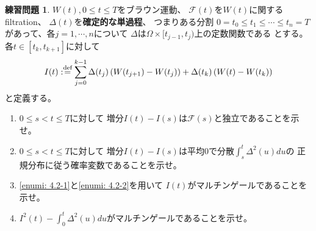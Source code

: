 \documentclass[uplatex]{jsarticle}
\theoremstyle{definition}
\newtheorem{prob}[prob]{練習問題}
\def\mcF{\mathcal{F}}
\def\dfn{:\overset{\mbox{{\scriptsize def}}}{=}}
\begin{document}
\begin{prob}\label{prob: 4.2}
  \(W(t), 0\leq t \leq T\)をブラウン運動、
  \(\mcF(t)\)を\(W(t)\)に関するfiltration、
  \(\Delta(t)\)を\textbf{確定的な単過程}、
  つまりある分割
  \(0 = t_0 \leq t_1 \leq \cdots \leq t_n = T\)
  があって、各\(j=1,\cdots, n\)について
  \(\Delta\)は\(\Omega\times [t_{j-1},t_j)\)上の定数関数である
  とする。
  各\(t\in [t_k,t_{k+1}]\)に対して
  \[
  I(t) \dfn \sum_{j=0}^{k-1}\Delta(t_j)\left( W(t_{j+1}) - W(t_j) \right)
  + \Delta(t_k) \left( W(t) - W(t_k) \right)
  \]
  と定義する。
  \begin{enumerate}
    \item \label{enumi: 4.2-1}
    \(0\leq s < t \leq T\)に対して
    増分\(I(t)-I(s)\)は\(\mcF(s)\)と独立であることを示せ。
    \item \label{enumi: 4.2-2}
    \(0\leq s < t \leq T\)に対して
    増分\(I(t)-I(s)\)は平均\(0\)で分散\(\int_s^t\Delta^2(u)du\)の
    正規分布に従う確率変数であることを示せ。
    \item \label{enumi: 4.2-3}
    \ref{enumi: 4.2-1}と\ref{enumi: 4.2-2}を用いて
    \(I(t)\)がマルチンゲールであることを示せ。
    \item \label{enumi: 4.2-4}
    \(I^2(t) - \int_0^t\Delta^2(u)du\)がマルチンゲールであることを示せ。
  \end{enumerate}
\end{prob}
\end{document}
